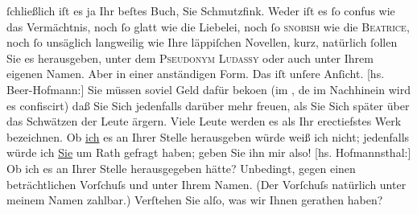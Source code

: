 \begin{ledgroupsized}[t]{13cm}
               ſchließlich {\pb}iſt es ja Ihr beſtes
                  Buch, Sie Schmutzfink. Weder
               iſt es ſo confus wie das Vermächtnis, noch ſo glatt
               wie die Liebelei, noch ſo \textsc{snobish} wie die \textsc{Beatrice}, noch ſo unsäglich langweilig wie Ihre läppiſchen Novellen, kurz, natürlich
               ſollen Sie es herausgeben, unter dem \textsc{Pseudonym}{ }\textsc{Ludassy} oder auch unter Ihrem eigenen Namen. Aber in einer {\pb}anständigen Form. Das iſt unſere
               Anſicht.\pend
           \pstart
           {[}hs. Beer-Hofmann:{]} Sie müssen soviel Geld dafür beko{\geminationm}en (im , de{\geminationn} im Nachhinein wird es confiscirt) daß Sie Sich
               jedenfalls darüber mehr freuen, als Sie Sich später über das Schwätzen der Leute
               ärgern. Viele Leute werden es als Ihr erectiefstes Werk bezeichnen. Ob \uline{ich} es an Ihrer Stelle herausgeben würde weiß ich nicht;
               jedenfalls würde ich \uline{Sie} um Rath gefragt haben; geben
               Sie ihn mir also!\pend
           \pstart
           {[}hs. Hofmannsthal:{]} Ob ich es an Ihrer Stelle herausgegeben hätte? Unbedingt,
               gegen einen beträchtlichen Vorſchuſs und unter Ihrem Namen. (Der Vorſchuſs natürlich
               unter meinem Namen zahlbar.)\pend
           \pstart
           Verſtehen Sie alſo, was wir Ihnen gerathen haben?\pend

\end{ledgroupsized}
